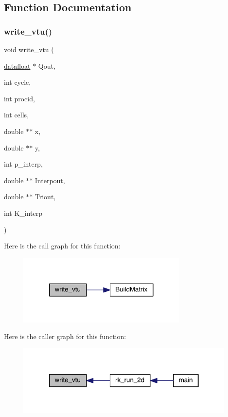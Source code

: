 \subsection{Function Documentation}
\mbox{\label{a00620_aa275e5ac3935009592aad28f023ed4a1}} 
\subsubsection{\texorpdfstring{write\+\_\+vtu()}{write\_vtu()}}
{\footnotesize\ttfamily void write\+\_\+vtu (\begin{DoxyParamCaption}\item[{\hyperlink{a00557_aa484d27c864c1a224505d8a302c0a4a4}{datafloat} $\ast$}]{Qout,  }\item[{int}]{cycle,  }\item[{int}]{procid,  }\item[{int}]{cells,  }\item[{double $\ast$$\ast$}]{x,  }\item[{double $\ast$$\ast$}]{y,  }\item[{int}]{p\+\_\+interp,  }\item[{double $\ast$$\ast$}]{Interpout,  }\item[{double $\ast$$\ast$}]{Triout,  }\item[{int}]{K\+\_\+interp }\end{DoxyParamCaption})}

Here is the call graph for this function\+:\nopagebreak
\begin{figure}[H]
\begin{center}
\leavevmode
\includegraphics[width=240pt]{a00620_aa275e5ac3935009592aad28f023ed4a1_cgraph}
\end{center}
\end{figure}
Here is the caller graph for this function\+:\nopagebreak
\begin{figure}[H]
\begin{center}
\leavevmode
\includegraphics[width=310pt]{a00620_aa275e5ac3935009592aad28f023ed4a1_icgraph}
\end{center}
\end{figure}
